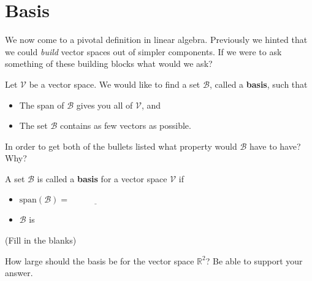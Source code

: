 %             


\section{Basis}
We now come to a pivotal definition in linear algebra.  Previously we hinted that we
could {\it build} vector spaces out of simpler components.  If we were to ask something of
these building blocks what would we ask?
\begin{problem}
    Let $\mathcal{V}$ be a vector space.  We would like to find a set $\mathcal{B}$,
    called a {\bf basis}, such that
    \begin{itemize}
        \item The span of $\mathcal{B}$ gives you all of $\mathcal{V}$, and 
        \item The set $\mathcal{B}$ contains as few vectors as possible.
    \end{itemize}
    In order to get both of the bullets listed what property would $\mathcal{B}$ have to
    have?  Why?
\end{problem}

\begin{definition}
    A set $\mathcal{B}$ is called a {\bf basis} for a vector space $\mathcal{V}$ if 
    \begin{itemize}
        \item $\text{span}(\mathcal{B}) = \underline{\hspace{1in}}$
        \item $\mathcal{B}$ is \underline{\hspace{1in}}
    \end{itemize}
    (Fill in the blanks)
\end{definition}

\begin{problem}
    How large should the basis be for the vector space $\mathbb{R}^2$?  Be able to support
    your answer.
\end{problem}

